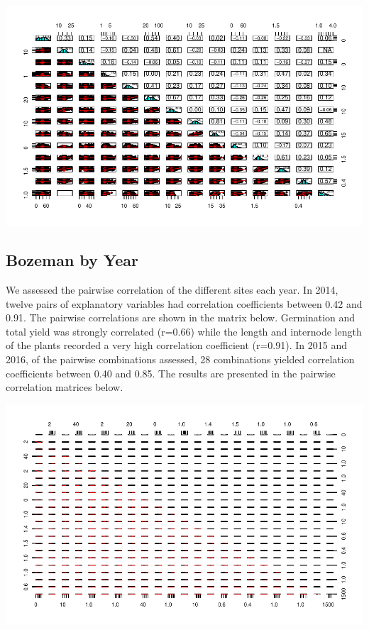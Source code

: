 \documentclass[11pt]{article}\usepackage[]{graphicx}\usepackage[]{color}
\makeatletter
\def\maxwidth{ %
  \ifdim\Gin@nat@width>\linewidth
    \linewidth
  \else
    \Gin@nat@width
  \fi
}
\newenvironment{knitrout}{}{} %
\makeatother
\begin{document}
\begin{knitrout}\footnotesize
{}\color{fgcolor}

{\centering \includegraphics[width=\maxwidth]{figure/merged-1} 

}



\end{knitrout}




\subsection{Bozeman by Year}
We assessed the pairwise correlation of the different sites each year. In 2014, twelve pairs of explanatory variables had correlation coefficients between 0.42 and 0.91. The pairwise correlations are shown in the matrix below. Germination and total yield was strongly correlated (r=0.66) while the length and internode length of the plants recorded a very high correlation coefficient (r=0.91). In 2015 and 2016, of the pairwise combinations assessed, 28 combinations yielded correlation coefficients between 0.40 and 0.85. The results are presented in the pairwise correlation matrices below.

\begin{knitrout}\footnotesize
{}\color{fgcolor}

{\centering \includegraphics[width=\maxwidth]{figure/bz-1} 

}



\end{knitrout}
\end{document}
